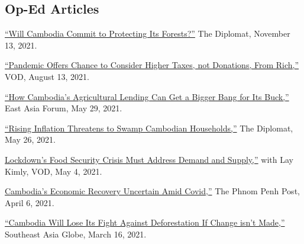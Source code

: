 \documentclass[10pt,a4paper]{article}
\begin{document}
\subsection*{Op-Ed Articles}

	\href{https://thediplomat.com/2021/11/will-cambodia-commit-to-protecting-its-forests/}{``Will Cambodia Commit to Protecting Its Forests?''} The Diplomat, November 13, 2021.\\ \vspace{-.5em}

	\href{https://vodenglish.news/opinion-pandemic-offers-chance-to-consider-higher-taxes-not-donations-from-rich/}{``Pandemic Offers Chance to Consider Higher Taxes, not Donations, From Rich,''} VOD, August 13, 2021.\\ \vspace{-.5em}

	\href{https://www.eastasiaforum.org/2021/05/29/how-cambodias-agricultural-lending-can-get-a-bigger-bang-for-its-buck/}{``How Cambodia's Agricultural Lending Can Get a Bigger Bang for Its Buck,''} East Asia Forum, May 29, 2021.\\ \vspace{-.5em}

	\href{https://thediplomat.com/2021/05/rising-inflation-threatens-to-swamp-cambodian-households/}{``Rising Inflation Threatens to Swamp Cambodian Households,''} The Diplomat, May 26, 2021.\\ \vspace{-.5em}

	\href{https://vodenglish.news/opinion-lockdowns-food-security-crisis-must-address-demand-and-supply/}{Lockdown's Food Security Crisis Must Address Demand and Supply,''} with Lay Kimly, VOD, May 4, 2021.\\ \vspace{-.5em}

	\href{https://www.phnompenhpost.com/opinion/cambodias-economic-recovery-uncertain-amid-covid}{Cambodia's Economic Recovery Uncertain Amid Covid,''} The Phnom Penh Post, April 6, 2021.\\ \vspace{-.5em}

	\href{https://southeastasiaglobe.com/cambodia-deforestation-fight/}{``Cambodia Will Lose Its Fight Against Deforestation If Change isn't Made,''} Southeast Asia Globe, March 16, 2021.\\ \vspace{-.5em}
\end{document}
